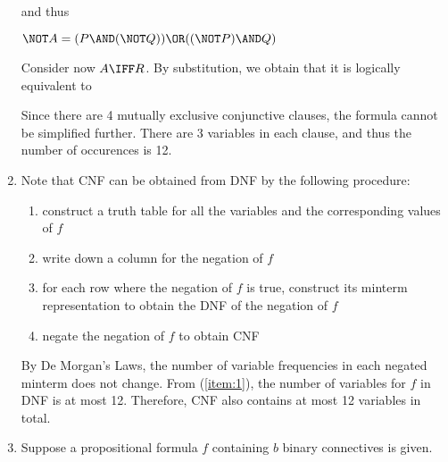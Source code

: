 \documentclass[11pt]{scrartcl}
\begin{document}
\begin{enumerate}
  and thus

  $\NOT A = ( P \AND (\NOT Q)) \OR ((\NOT P) \AND Q )$

  Consider now $A \IFF R$. By substitution, we obtain that it is
  logically equivalent to


  Since there are 4 mutually exclusive conjunctive clauses, the
  formula cannot be simplified further. There are 3 variables in each
  clause, and thus the number of occurences is 12.
\item
  \label{item:3}
  Note that CNF can be obtained from DNF by the following procedure:

  \begin{enumerate}[label=\alph*)]
  \item construct a truth table for all the variables and the corresponding values of $f$
  \item write down a column for the negation of $f$
  \item for each row where the negation of $f$ is true, construct its
    minterm representation to obtain the DNF of the negation of $f$
  \item negate the negation of $f$ to obtain CNF
  \end{enumerate}

  By De Morgan's Laws, the number of variable frequencies in each
  negated minterm does not change. From (\ref{item:1}), the number of
  variables for $f$ in DNF is at most 12. Therefore, CNF also contains at most 12
  variables in total.
\item
  \label{item:4}
  Suppose a propositional formula $f$ containing $b$ binary
  connectives is given.


\end{enumerate}
\end{document}
